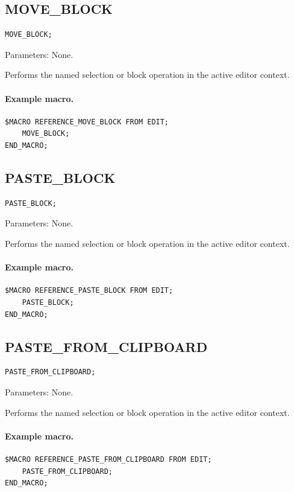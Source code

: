 \documentclass[a4paper,10pt,twoside,openany]{book}
\newenvironment{mrmacextension}{\begin{changebar}}{\end{changebar}}
\begin{document}
\subsection*{MOVE\_BLOCK}
\begin{verbatim}
MOVE_BLOCK;
\end{verbatim}
Parameters: None.

Performs the named selection or block operation in the active editor context.

\paragraph{Example macro.}
\begin{verbatim}
$MACRO REFERENCE_MOVE_BLOCK FROM EDIT;
    MOVE_BLOCK;
END_MACRO;
\end{verbatim}

\begin{mrmacextension}
\label{prim:procedure-paste-block}
\subsection*{PASTE\_BLOCK}
\begin{verbatim}
PASTE_BLOCK;
\end{verbatim}
Parameters: None.

Performs the named selection or block operation in the active editor context.

\paragraph{Example macro.}
\begin{verbatim}
$MACRO REFERENCE_PASTE_BLOCK FROM EDIT;
    PASTE_BLOCK;
END_MACRO;
\end{verbatim}
\end{mrmacextension}

\begin{mrmacextension}
\label{prim:procedure-paste-from-clipboard}
\subsection*{PASTE\_FROM\_CLIPBOARD}
\begin{verbatim}
PASTE_FROM_CLIPBOARD;
\end{verbatim}
Parameters: None.

Performs the named selection or block operation in the active editor context.

\paragraph{Example macro.}
\begin{verbatim}
$MACRO REFERENCE_PASTE_FROM_CLIPBOARD FROM EDIT;
    PASTE_FROM_CLIPBOARD;
END_MACRO;
\end{verbatim}
\end{mrmacextension}
\end{document}
